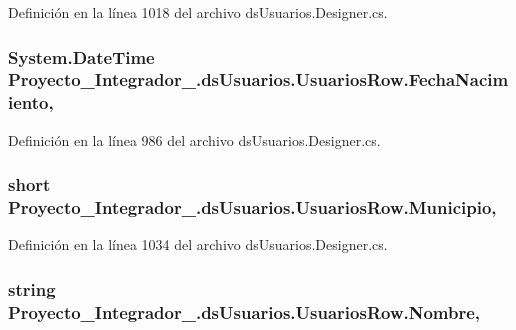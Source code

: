 Definición en la línea 1018 del archivo ds\-Usuarios.\-Designer.\-cs.

\hypertarget{class_proyecto___integrador__3_1_1ds_usuarios_1_1_usuarios_row_afa3832e8eeb4e9b652518de75e15b432}{
\subsubsection[{Fecha\-Nacimiento}]{\setlength{\rightskip}{0pt plus 5cm}System.\-Date\-Time Proyecto\-\_\-\-Integrador\-\_.\-ds\-Usuarios.\-Usuarios\-Row.\-Fecha\-Nacimiento\hspace{0.3cm}{\ttfamily [get]}, {\ttfamily [set]}}}\label{class_proyecto___integrador__3_1_1ds_usuarios_1_1_usuarios_row_afa3832e8eeb4e9b652518de75e15b432}


Definición en la línea 986 del archivo ds\-Usuarios.\-Designer.\-cs.

\hypertarget{class_proyecto___integrador__3_1_1ds_usuarios_1_1_usuarios_row_a041ccccf07ecbeb1feb041650c93be2a}{
\subsubsection[{Municipio}]{\setlength{\rightskip}{0pt plus 5cm}short Proyecto\-\_\-\-Integrador\-\_.\-ds\-Usuarios.\-Usuarios\-Row.\-Municipio\hspace{0.3cm}{\ttfamily [get]}, {\ttfamily [set]}}}\label{class_proyecto___integrador__3_1_1ds_usuarios_1_1_usuarios_row_a041ccccf07ecbeb1feb041650c93be2a}


Definición en la línea 1034 del archivo ds\-Usuarios.\-Designer.\-cs.

\hypertarget{class_proyecto___integrador__3_1_1ds_usuarios_1_1_usuarios_row_a7ae7f1dd4b1d6edfab95ee9789ad44e0}{
\subsubsection[{Nombre}]{\setlength{\rightskip}{0pt plus 5cm}string Proyecto\-\_\-\-Integrador\-\_.\-ds\-Usuarios.\-Usuarios\-Row.\-Nombre\hspace{0.3cm}{\ttfamily [get]}, {\ttfamily [set]}}}\label{class_proyecto___integrador__3_1_1ds_usuarios_1_1_usuarios_row_a7ae7f1dd4b1d6edfab95ee9789ad44e0}


